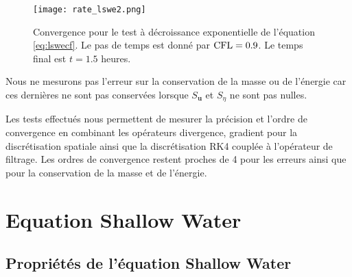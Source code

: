 \begin{figure}[htbp]
\begin{center}
\texttt{[image: rate\_lswe2.png]}
\end{center}
\caption{Convergence pour le test à décroissance exponentielle de l'équation \eqref{eq:lswecf}. Le pas de temps est donné par $\text{CFL}=0.9$. Le temps final est $t=1.5$ heures.}
\label{fig:rate_lswe2}
\end{figure}

Nous ne mesurons pas l'erreur sur la conservation de la masse ou de l'énergie car ces dernières ne sont pas conservées lorsque $S_{\mathbf{u}}$ et $S_{\eta}$ ne sont pas nulles.

Les tests effectués nous permettent de mesurer la précision et l'ordre de convergence en combinant les opérateurs divergence, gradient pour la discrétisation spatiale ainsi que la discrétisation RK4 couplée à l'opérateur de filtrage. Les ordres de convergence restent proches de 4 pour les erreurs ainsi que pour la conservation de la masse et de l'énergie. 



























\section{Equation Shallow Water}

\subsection{Propriétés de l'équation Shallow Water}

